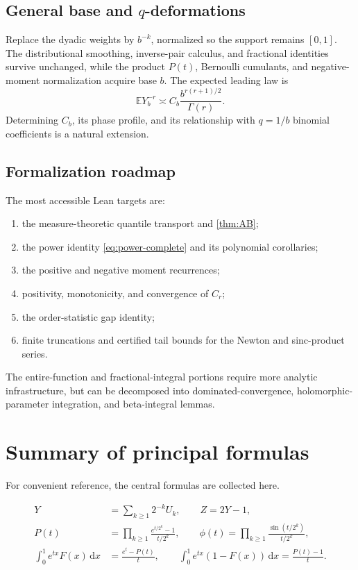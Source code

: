 \documentclass[11pt,oneside]{article}
\theoremstyle{definition}
\newcommand{\F}{F}
\newcommand{\E}{\mathbb E}
\newcommand{\dd}{\,\mathrm d}
\begin{document}
\subsection{General base and \texorpdfstring{\(q\)}{q}-deformations}

Replace the dyadic weights by \(b^{-k}\), normalized so the support remains \([0,1]\).
The distributional smoothing, inverse-pair calculus, and fractional identities survive
unchanged, while the product \(P(t)\), Bernoulli cumulants, and negative-moment
normalization acquire base \(b\).  The expected leading law is
\begin{equation}\label{eq:baseb-heuristic}
 \E Y_b^{-r}
 \asymp C_b\frac{b^{r(r+1)/2}}{\Gamma(r)}.
\end{equation}
Determining \(C_b\), its phase profile, and its relationship with \(q=1/b\) binomial
coefficients is a natural extension.

\subsection{Formalization roadmap}

The most accessible Lean targets are:
\begin{enumerate}
\item the measure-theoretic quantile transport and \cref{thm:AB};
\item the power identity \cref{eq:power-complete} and its polynomial corollaries;
\item the positive and negative moment recurrences;
\item positivity, monotonicity, and convergence of \(C_r\);
\item the order-statistic gap identity;
\item finite truncations and certified tail bounds for the Newton and sinc-product
series.
\end{enumerate}
The entire-function and fractional-integral portions require more analytic infrastructure,
but can be decomposed into dominated-convergence, holomorphic-parameter integration,
and beta-integral lemmas.

\section{Summary of principal formulas}

For convenient reference, the central formulas are collected here.

\begin{resultbox}
\begin{align*}
 Y&=\sum_{k\ge1}2^{-k}U_k,\qquad Z=2Y-1,\\
 P(t)&=\prod_{k\ge1}\frac{e^{t/2^k}-1}{t/2^k},\qquad
 \phi(t)=\prod_{k\ge1}\frac{\sin(t/2^k)}{t/2^k},\\
 \int_0^1e^{tx}\F(x)\dd x&=\frac{e^t-P(t)}t,\qquad
 \int_0^1e^{tx}(1-\F(x))\dd x=\frac{P(t)-1}t.
\end{align*}
\end{resultbox}
\end{document}
